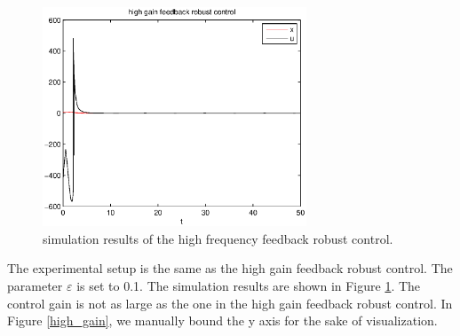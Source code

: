 \documentclass[12pt,a4paper]{article}
\begin{document}
\begin{figure}
  \centering
  \includegraphics[width=0.7\textwidth]{figs/high_freq.eps}%
  \caption{simulation results of the high frequency feedback robust control.}
  \label{high_freq}
\end{figure}

\indent The experimental setup is the same as the high gain feedback robust control. The parameter $\varepsilon$ is set to 0.1. The simulation results are shown in Figure \ref{high_freq}. The control gain is not as large as the one in the high gain feedback robust control. In Figure \ref{high_gain}, we manually bound the y axis for the sake of visualization.
\end{document}
